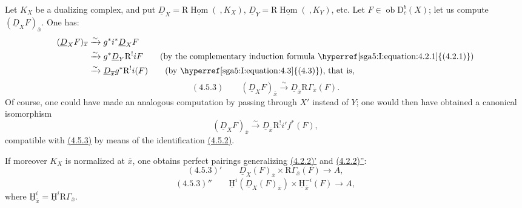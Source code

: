\documentclass[11pt]{article}
\providecommand{\uH}{\underline{\mathrm H}}
\DeclareMathOperator{\Hom}{Hom}
\newcommand{\R}{\mathrm{R}}
\newcommand{\D}{\mathrm{D}}
\newcommand{\ob}{\operatorname{ob}}
\newcommand{\ol}[1]{\overline{#1}}
\providecommand{\Hom}{\operatorname{Hom}}
\providecommand{\ob}{\operatorname{ob}}
\providecommand{\R}{\mathrm R}
\providecommand{\Hom}{\operatorname{Hom}}
\begin{document}
Let $K_X$ be a dualizing complex, and put $\underline{D}_X=\R\underline{\Hom}(\ ,K_X)$, $\underline{D}_Y=\R\underline{\Hom}(\ ,K_Y)$, etc. Let $F\in\ob\D_c^b(X)$; let us compute $(\underline{D}_XF)_{\ol{x}}$. One has:
\[
\begin{aligned}
(\underline{D}_XF)_{\ol{x}}&\xrightarrow{\sim}g^*i^*\underline{D}_X F\\
&\xrightarrow{\sim}g^*\underline{D}_Y\R^{!}iF\qquad\text{(by the complementary induction formula \hyperref[sga5:I:equation:4.2.1]{(4.2.1)})}\\
&\xrightarrow{\sim}\underline{D}_{\ol{x}}g^*\R^{!}i(F)\qquad\text{(by \hyperref[sga5:I:equation:4.3]{(4.3)}), that is,}
\end{aligned}
\]
\label{sga5:I:equation:4.5.3}\[
(4.5.3)\qquad (\underline{D}_X F)_{\ol{x}}\xrightarrow{\sim}\underline{D}_{\ol{x}}\R\Gamma_{\ol{x}}(F).
\]
Of course, one could have made an analogous computation by passing through $X'$ instead of $Y$; one would then have obtained a canonical isomorphism
\[
(\underline{D}_XF)_{\ol{x}}\xrightarrow{\sim}\underline{D}_{\ol{x}}\R^{!}i'f^*(F),
\]
compatible with \hyperref[sga5:I:equation:4.5.3]{(4.5.3)} by means of the identification \hyperref[sga5:I:equation:4.5.2]{(4.5.2)}.

If moreover $K_X$ is normalized at $\ol{x}$, one obtains perfect pairings generalizing \hyperref[sga5:I:equation:4.2.2:2]{(4.2.2)'} and \hyperref[sga5:I:equation:4.2.2:3]{(4.2.2)''}:
\label{sga5:I:equation:4.5.3:2}\[
(4.5.3)'\qquad \underline{D}_X(F)_{\ol{x}}\times \R\Gamma_{\ol{x}}(F)\longrightarrow A,
\]
\label{sga5:I:equation:4.5.3:3}\[
(4.5.3)''\qquad \uH^i(\underline{D}_X(F)_{\ol{x}})\times \uH_{\ol{x}}^{-i}(F)\longrightarrow A,
\]
where $\uH_{\ol{x}}^i=\uH^i\R\Gamma_{\ol{x}}$.
\end{document}
